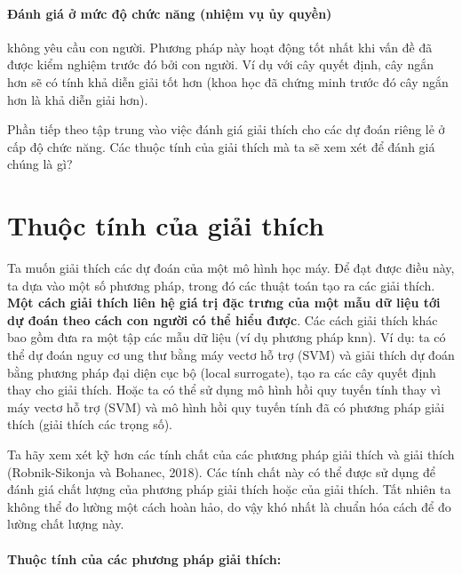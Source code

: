 \paragraph{Đánh giá ở mức độ chức năng (nhiệm vụ ủy quyền)} không yêu cầu con người. Phương pháp này hoạt động tốt nhất khi vấn đề đã được kiểm nghiệm trước đó bởi con người.  Ví dụ với cây quyết định, cây ngắn hơn sẽ có tính khả diễn giải tốt hơn (khoa học đã chứng minh trước đó cây ngắn hơn là khả diễn giải hơn).


Phần tiếp theo tập trung vào việc đánh giá giải thích cho các dự đoán riêng lẻ ở cấp độ chức năng. Các thuộc tính của giải thích mà ta sẽ xem xét để đánh giá chúng là gì?

\clearpage

\section{Thuộc tính của giải thích}

Ta muốn giải thích các dự đoán của một mô hình học máy. Để đạt được điều này, ta dựa vào một số phương pháp, trong đó các thuật toán tạo ra các giải thích. \textbf{Một cách giải thích liên hệ giá trị đặc trưng của một mẫu dữ liệu tới dự đoán theo cách con người có thể hiểu được}. Các cách giải thích khác bao gồm đưa ra một tập các mẫu dữ liệu (ví dụ phương pháp knn). Ví dụ: ta có thể dự đoán nguy cơ ung thư bằng máy vectơ hỗ trợ (SVM) và giải thích dự đoán bằng phương pháp đại diện cục bộ (local surrogate), tạo ra các cây quyết định thay cho giải thích. Hoặc ta có thể sử dụng mô hình hồi quy tuyến tính thay vì máy vectơ hỗ trợ (SVM) và mô hình hồi quy tuyến tính đã có phương pháp giải thích (giải thích các trọng số).

Ta hãy xem xét kỹ hơn các tính chất của các phương pháp giải thích và giải thích (Robnik-Sikonja và Bohanec, 2018). Các tính chất này có thể được sử dụng để đánh giá chất lượng của phương pháp giải thích hoặc của giải thích. Tất nhiên ta không thể đo lường một cách hoàn hảo, do vậy khó nhất là chuẩn hóa cách để đo lường chất lượng này.

\paragraph{Thuộc tính của các phương pháp giải thích:}

